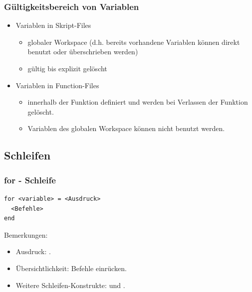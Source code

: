 \documentclass[hyperref={xetex}]{beamer}
\begin{document}
%
%
\begin{frame}[fragile]\frametitle{Gültigkeitsbereich von Variablen}
\begin{itemize}
\item \alert{Variablen in Skript-Files} 
\begin{itemize}
\item globaler Workspace (d.h. bereits vorhandene Variablen können direkt benutzt oder
  überschrieben werden)
\item gültig bis explizit gelöscht
\end{itemize}
\item \alert{Variablen in Function-Files} 
\begin{itemize}
\item innerhalb der Funktion definiert und werden bei Verlassen der Funktion
  gelöscht.
\item Variablen des globalen Workspace können nicht benutzt werden. 
\end{itemize} 
\end{itemize}
\end{frame}

\subsection{Schleifen}
%
%
\begin{frame}[fragile]\frametitle{for - Schleife}
\begin{lstlisting}
for <variable> = <Ausdruck>
  <Befehle>
end
\end{lstlisting}
\alert{Bemerkungen:} 
\begin{itemize}
\item Ausdruck: . 
\item Übersichtlichkeit: \alert{Befehle} einrücken. 
\item Weitere Schleifen-Konstrukte:  und .
\end{itemize}
\end{frame}
\end{document}
